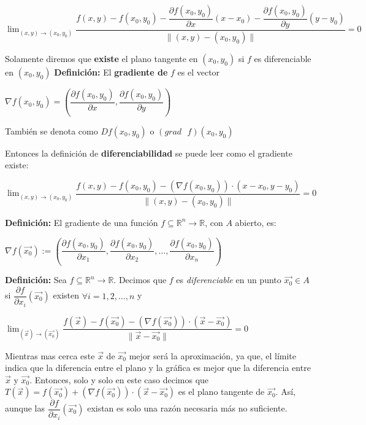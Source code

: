 \documentclass[12pt]{article}
\begin{document}
    ${\lim_{(x,y)\rightarrow(x_0,y_0)}{\dfrac{f(x,y)-f(x_0,y_0)-\dfrac{\partial f(x_0,y_0)}{\partial x}{(x-x_0)}-\dfrac{\partial f(x_0,y_0)}{\partial y}{(y-y_0)}}{\|(x,y)-(x_0,y_0)\|}}=0}$


\noindent Solamente diremos que \textbf{existe} el plano tangente en $(x_0,y_0)$ si $f$ es diferenciable en $(x_0,y_0)$
\newline
\newpage
\noindent \textbf{Definición:} El \textbf{gradiente de }$f$ es el vector
\begin{center}
    $\nabla f(x_0,y_0)=\left(\dfrac{\partial f(x_0,y_0)}{\partial x},\dfrac{\partial f(x_0,y_0)}{\partial y} \right)$
\end{center}
\noindent También se denota como $Df(x_0,y_0)$ o $(grad\text{ }f)(x_0,y_0)$

Entonces la definición de \textbf{diferenciabilidad} se puede leer como el gradiente existe:
\begin{center}
    ${\lim_{(x,y)\rightarrow(x_0,y_0)}{\dfrac{f(x,y)-f(x_0,y_0)-\left(\nabla f(x_0,y_0)\right)\cdot\left(x-x_0,y-y_0\right)}{\|(x,y)-(x_0,y_0)\|}}=0}$
\end{center}

\noindent \textbf{Definición: }El gradiente de una función $f\subseteq\mathbb{R}^n\rightarrow\mathbb{R}$, con $A$ abierto, es:
\begin{center}
    $\nabla{f(\vec{x_0})}:=\left(\dfrac{\partial f(x_0,y_0)}{\partial x_1},\dfrac{\partial f(x_0,y_0)}{\partial x_2},\dots,\dfrac{\partial f(x_0,y_0)}{\partial x_n}\right)$
\end{center}

\noindent \textbf{Definición: } Sea $f\subseteq\mathbb{R}^n\rightarrow\mathbb{R}$. Decimos que $f$ es \emph{diferenciable} en un 
punto $\vec{x_0}\in A$ si $\dfrac{\partial f}{\partial x_i}(\vec{x_0})$ existen $\forall i=1,2,\dots,n$ y 
\begin{center}
    ${\lim_{(\vec{x})\rightarrow(\vec{x_0})}{\dfrac{f(\vec{x})-f(\vec{x_0})-\left(\nabla f(\vec{x_0})\right)\cdot\left(\vec{x}-\vec{x_0}\right)}{\|\vec{x}-\vec{x_0}\|}}=0}$
\end{center}
\noindent Mientras mas cerca este $\vec{x}$ de $\vec{x_0}$ mejor será la aproximación, ya que, el límite indica que la diferencia entre
el plano y la gráfica es mejor que la diferencia entre $\vec{x}$ y $\vec{x_0}$. Entonces, solo y solo en este caso decimos que $T(\vec{x})= f(\vec{x_0})+\left(\nabla f(\vec{x_0})\right)\cdot\left(\vec{x}-\vec{x_0}\right)$
es el plano tangente de $\vec{x_0}$. Así, aunque las  $\dfrac{\partial{f}}{\partial{x_i}}{(\vec{x_0})}$ existan es solo una razón necesaria más no suficiente.
\end{document}
